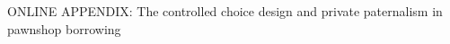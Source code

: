 
\setcounter{table}{0}
\setcounter{figure}{0}
\setcounter{section}{0}
\renewcommand\thefigure{OA-\arabic{figure}}
\renewcommand\thetable{OA-\arabic{table}}
\renewcommand*{\thepage}{OA - \arabic{page}}
\renewcommand\thesection{Appendix \Alph{section}.}
\renewcommand\thesubsection{\Alph{section}.\arabic{subsection}}

\begin{center}
	\Large ONLINE APPENDIX: The controlled choice design and private paternalism in pawnshop borrowing \\[0.5em]
	\large \author{Craig McIntosh \and Isaac Meza \and Joyce Sadka \and Enrique Seira \and Francis J.\ DiTraglia}
\end{center}



